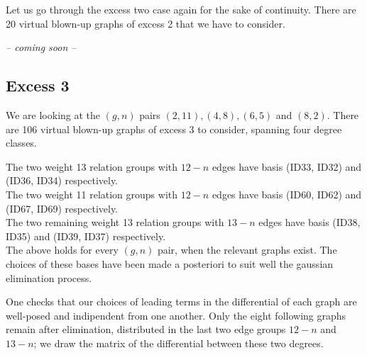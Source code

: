Let us go through the excess two case again for the sake of continuity. There are 20 virtual blown-up graphs of excess 2 that we have to consider.

\textit{-- coming soon --}





\subsection{Excess 3} We are looking at the $(g,n)$ pairs $(2,11),(4,8),(6,5)$ and $(8,2)$.
There are 106 virtual blown-up graphs of excess 3 to consider, spanning four degree classes.

The two weight 13 relation groups with $12-n$ edges have basis (ID33, ID32) and (ID36, ID34) respectively.\\
The two weight 11 relation groups with $12-n$ edges have basis (ID60, ID62) and (ID67, ID69) respectively.\\
The two remaining weight 13 relation groups with $13-n$ edges have basis (ID38, ID35) and (ID39, ID37) respectively.\\
The above holds for every $(g,n)$ pair, when the relevant graphs exist. The choices of these bases have been made a posteriori to suit well the gaussian elimination process.

One checks that our choices of leading terms in the differential of each graph are well-posed and indipendent from one another. Only the eight following graphs remain after elimination, distributed in the last two edge groups $12-n$ and $13-n$; we draw the matrix of the differential between these two degrees.

